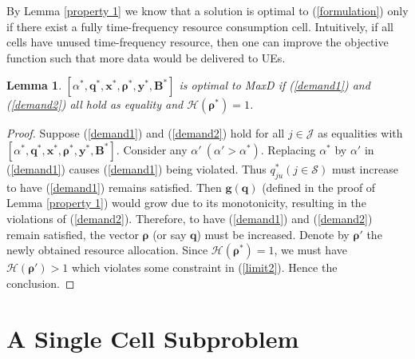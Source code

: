 \documentclass[10pt,journal,final,finalsubmission,twocolumn]{IEEEtran}
\newtheorem{lemma}[theorem]{Lemma}
\begin{document}
By Lemma \ref{property 1} we know that a solution is optimal to (\ref{formulation}) only if there exist a fully time-frequency resource consumption cell. Intuitively, if all cells have unused time-frequency resource, then one can improve the objective function such that more data would be delivered to UEs. 


\begin{lemma}\label{property 2}
$[\alpha ^*, \boldsymbol{q}^*,\boldsymbol{x}^*,\boldsymbol{\rho}^*, \boldsymbol{y}^*,\boldsymbol{B}^*]$ is optimal to MaxD if (\ref{demand1}) and (\ref{demand2}) all hold as equality and $\mathcal{H}(\boldsymbol{\rho^*}) = 1$.
\end{lemma}
\begin{proof}
Suppose (\ref{demand1}) and (\ref{demand2}) hold for all $j\in \mathcal{J}$ as equalities with $[\alpha ^*, \boldsymbol{q}^*,\boldsymbol{x}^*,\boldsymbol{\rho}^*, \boldsymbol{y}^*,\boldsymbol{B}^*]$. Consider any $\alpha ' \ (\alpha' > \alpha^*)$. Replacing $\alpha^*$ by $\alpha '$ in (\ref{demand1}) causes (\ref{demand1}) being violated. Thus $q_{ju}^* (j\in\mathcal{S})$ must increase to have (\ref{demand1}) remains satisfied. Then $\boldsymbol{g} (\boldsymbol{q}) $ (defined in the proof of Lemma \ref{property 1}) would grow due to its monotonicity, resulting in the violations of (\ref{demand2}). Therefore, to have (\ref{demand1}) and (\ref{demand2}) remain satisfied, the vector $\boldsymbol{\rho}$ (or say $\boldsymbol{q}$) must be increased. Denote by $\boldsymbol{\rho}'$ the newly obtained resource allocation. Since $\mathcal{H}(\boldsymbol{\rho}^*) = 1$, we must have $\mathcal{H}(\boldsymbol{\rho}') > 1$ which violates some constraint in (\ref{limit2}). Hence the conclusion.
\end{proof}

\section{A Single Cell Subproblem}\label{CellLoadsMinimization}
\end{document}

